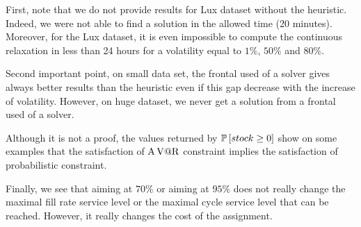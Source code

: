 First, note that we do not provide results for Lux dataset without the heuristic.
Indeed, we were not able to find a solution in the allowed time (20 minutes).
Moreover, for the Lux dataset, it is even impossible to compute the continuous relaxation in less than 24 hours for a volatility equal to $1\%$, $50\%$ and $80\%$.


Second important point, on small data set, the frontal used of a solver gives always better results than the heuristic even if this gap decrease with the increase of volatility.
However, on huge dataset, we never get a solution from a frontal used of a solver.


Although it is not a proof, the values returned by $\prob\sqbracket{stock\ge0}$ show on some examples that the satisfaction of $\operatorname{A\operatorname{V@R}}$ constraint implies the satisfaction of probabilistic constraint.


Finally, we see that aiming at $70\%$ or aiming at $95\%$ does not really change the maximal fill rate service level or the maximal cycle service level that can be reached.
However, it really changes the cost of the assignment.




